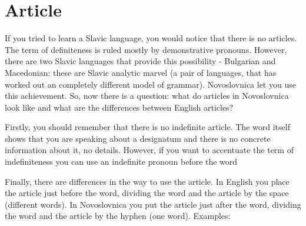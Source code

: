 \section{Article}

If you tried to learn a Slavic language, you would notice that there is no articles. The term of definiteness is ruled mostly by demonstrative pronouns. However, there are two Slavic languages that provide this possibility - Bulgarian and Macedonian: these are Slavic analytic marvel (a pair of languages, that has worked out an completely different model of grammar). Novoslovnica let you use this achievement. So, now there is a question: what do articles in Novoslovnica look like and what are the differences between English articles?

Firstly, you should remember that there is no indefinite article. The word itself shows that you are speaking about a designatum and there is no concrete information about it, no details. However, if you want to accentuate the term of indefiniteness you can use an indefinite pronoun before the word 



Finally, there are differences in the way to use the article. In English you place the article just before the word, dividing the word and the article by the space (different words). In Novoslovnica you put the article just after the word, dividing the word and the article by the hyphen (one word).
Examples: 


